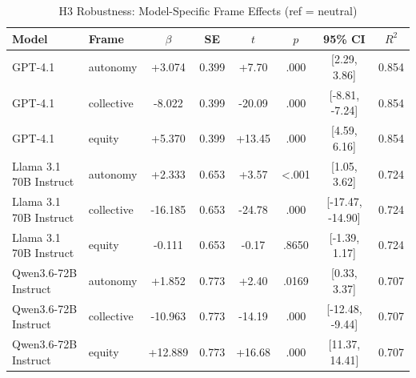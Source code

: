 \begin{table}[ht]
\centering
\caption{H3 Robustness: Model-Specific Frame Effects (ref = neutral)}
\label{tab:h3-model-frame}
\begin{tabular}{llcccccc}
\toprule
Model & Frame & $\beta$ & SE & $t$ & $p$ & 95\% CI & $R^2$ \\
\midrule
GPT-4.1 & autonomy & +3.074 & 0.399 & +7.70 & .000 & [2.29, 3.86] & 0.854 \\
GPT-4.1 & collective & -8.022 & 0.399 & -20.09 & .000 & [-8.81, -7.24] & 0.854 \\
GPT-4.1 & equity & +5.370 & 0.399 & +13.45 & .000 & [4.59, 6.16] & 0.854 \\
\addlinespace
Llama 3.1 70B Instruct & autonomy & +2.333 & 0.653 & +3.57 & <.001 & [1.05, 3.62] & 0.724 \\
Llama 3.1 70B Instruct & collective & -16.185 & 0.653 & -24.78 & .000 & [-17.47, -14.90] & 0.724 \\
Llama 3.1 70B Instruct & equity & -0.111 & 0.653 & -0.17 & .8650 & [-1.39, 1.17] & 0.724 \\
\addlinespace
Qwen3.6-72B Instruct & autonomy & +1.852 & 0.773 & +2.40 & .0169 & [0.33, 3.37] & 0.707 \\
Qwen3.6-72B Instruct & collective & -10.963 & 0.773 & -14.19 & .000 & [-12.48, -9.44] & 0.707 \\
Qwen3.6-72B Instruct & equity & +12.889 & 0.773 & +16.68 & .000 & [11.37, 14.41] & 0.707 \\
\bottomrule
\end{tabular}
\end{table}
